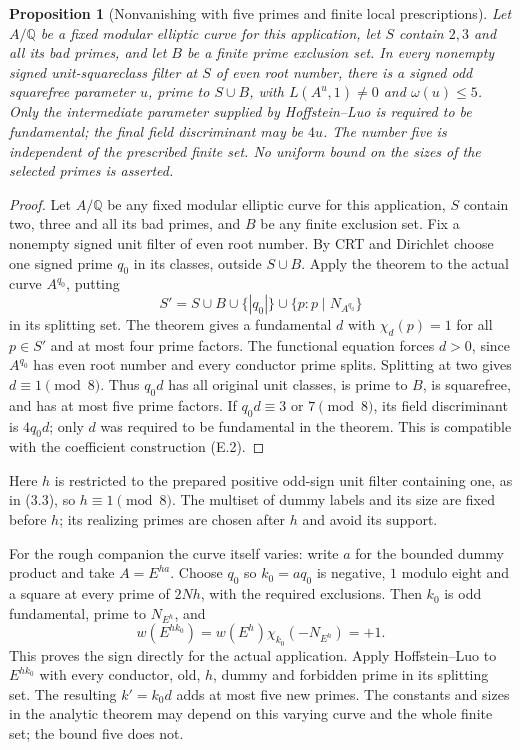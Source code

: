 \documentclass[11pt]{article}
\newtheorem{proposition}[theorem]{Proposition}
\theoremstyle{definition}
\theoremstyle{remark}
\newcommand{\Q}{\mathbb Q}
\begin{document}
\begin{proposition}[Nonvanishing with five primes and finite local prescriptions]\label{ex:app-five-prime}
Let $A/\Q$ be a fixed modular elliptic curve for this application,
let $S$ contain $2,3$ and all its bad primes, and let $B$ be a finite
prime exclusion set. In every nonempty signed unit-squareclass filter
at $S$ of even root number, there is a signed odd squarefree parameter
$u$, prime to $S\cup B$, with $L(A^u,1)\ne0$ and $\omega(u)\le5$.
Only the intermediate parameter supplied by Hoffstein--Luo is required
to be fundamental; the final field discriminant may be $4u$.
The number five is independent of the prescribed finite set. No
uniform bound on the sizes of the selected primes is asserted.
\end{proposition}
\begin{proof}\leavevmode
Let $A/\Q$ be any fixed modular elliptic curve for this application,
$S$ contain two, three and all its bad primes, and $B$ be any finite
exclusion set. Fix a nonempty signed unit filter of even root number.
By CRT and Dirichlet choose one signed prime $q_0$ in its classes,
outside $S\cup B$. Apply the theorem to the actual curve $A^{q_0}$,
putting
\[
                 S'=S\cup B\cup\{|q_0|\}\cup
                               \{p:p\mid N_{A^{q_0}}\}
\]
in its splitting set. The theorem gives a fundamental $d$ with
$\chi_d(p)=1$ for all $p\in S'$ and at most four prime factors.
The functional equation forces $d>0$, since $A^{q_0}$ has even
root number and every conductor prime splits. Splitting at two
gives $d\equiv1\pmod8$. Thus $q_0d$ has all original unit
classes, is prime to $B$, is squarefree, and has at most five
prime factors. If $q_0d\equiv3$ or $7\pmod8$, its field
discriminant is $4q_0d$; only $d$ was required to be fundamental
in the theorem. This is compatible with the coefficient
construction (E.2).
\end{proof}

Here $h$ is restricted to the prepared positive odd-sign unit
filter containing one, as in (3.3), so $h\equiv1\pmod8$.
The multiset of dummy labels and its size are fixed before $h$;
its realizing primes are chosen after $h$ and avoid its support.

For the rough companion the curve itself varies:
write $a$ for the bounded dummy product and take $A=E^{ha}$.
Choose $q_0$ so $k_0=aq_0$ is negative, $1$ modulo eight and
a square at every prime of $2Nh$, with the required exclusions.
Then $k_0$ is odd fundamental, prime to $N_{E^h}$, and
\[
          w(E^{hk_0})=w(E^h)\chi_{k_0}(-N_{E^h})=+1.
\]
This proves the sign directly for the actual application.
Apply Hoffstein--Luo to $E^{hk_0}$ with every conductor,
old, $h$, dummy and forbidden prime in its splitting set.
The resulting $k'=k_0d$ adds at most five new primes.
The constants and sizes in the analytic theorem may depend on
this varying curve and the whole finite set; the bound five does not.
\end{document}
